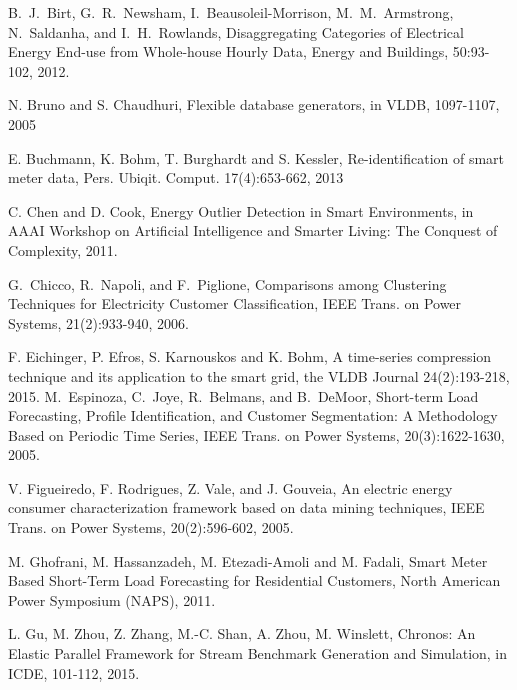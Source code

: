 \documentclass[prodmode,acmtods]{acmsmall}
\begin{document}
\begin{thebibliography}{12}
B.~J.~Birt,  G.~R.~Newsham,  I.~Beausoleil-Morrison, M.~M.~Armstrong,  N.~Saldanha, and I.~H.~Rowlands, Disaggregating Categories of Electrical Energy End-use from Whole-house Hourly Data, Energy and Buildings, 50:93-102, 2012.

N. Bruno and S. Chaudhuri, Flexible database generators, in VLDB, 1097-1107, 2005
 
E. Buchmann, K. Bohm, T. Burghardt and S. Kessler, Re-identification of smart meter data, Pers. Ubiqit. Comput. 17(4):653-662, 2013

C. Chen and D. Cook, Energy Outlier Detection in Smart Environments, in AAAI Workshop on Artificial Intelligence and Smarter Living: The Conquest of Complexity, 2011.

G.~Chicco, R.~Napoli, and F.~Piglione, Comparisons among Clustering Techniques for Electricity Customer Classification, IEEE Trans. on Power Systems, 21(2):933-940, 2006.

F. Eichinger, P. Efros, S. Karnouskos and K. Bohm, A time-series compression technique and its application to the smart grid, the VLDB Journal 24(2):193-218, 2015.
M.~Espinoza,  C.~Joye,  R.~Belmans, and B.~DeMoor, Short-term Load Forecasting, Profile Identification, and Customer Segmentation: A Methodology Based on Periodic Time Series, IEEE Trans. on Power Systems, 20(3):1622-1630, 2005.

V. Figueiredo, F. Rodrigues, Z. Vale, and J. Gouveia, An electric energy consumer characterization framework based on data mining techniques, IEEE Trans. on Power Systems, 20(2):596-602, 2005.

M. Ghofrani, M. Hassanzadeh, M. Etezadi-Amoli and M. Fadali, Smart Meter Based Short-Term Load Forecasting for Residential Customers, North American Power Symposium (NAPS), 2011.


L. Gu, M. Zhou, Z. Zhang, M.-C. Shan, A. Zhou, M. Winslett, Chronos: An Elastic Parallel Framework for Stream Benchmark Generation and Simulation, in ICDE, 101-112, 2015.


\end{thebibliography}
\end{document}
